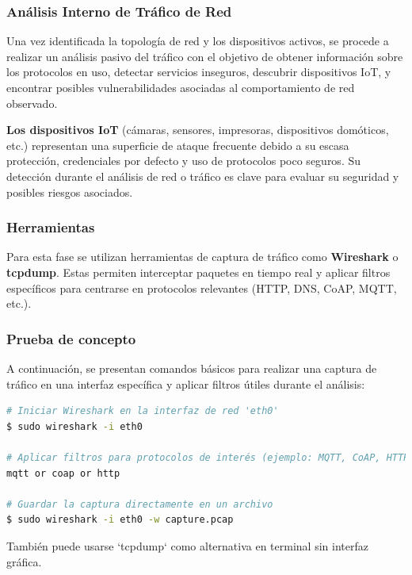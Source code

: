 \documentclass[a4paper, 11pt]{article}
\begin{document}
\subsubsection{Análisis Interno de Tráfico de Red}

Una vez identificada la topología de red y los dispositivos activos, se procede a realizar un análisis pasivo del tráfico con el objetivo 
de obtener información sobre los protocolos en uso, detectar servicios inseguros, descubrir dispositivos IoT, y encontrar posibles vulnerabilidades asociadas al comportamiento de red observado.


\textbf{Los dispositivos IoT} (cámaras, sensores, impresoras, dispositivos domóticos, etc.) representan una superficie de 
ataque frecuente debido a su escasa protección, credenciales por defecto y uso de protocolos poco seguros. Su detección durante 
el análisis de red o tráfico es clave para evaluar su seguridad y posibles riesgos asociados.


\subsubsection*{Herramientas}

Para esta fase se utilizan herramientas de captura de tráfico como \textbf{Wireshark} o \textbf{tcpdump}. Estas permiten interceptar paquetes en tiempo real y aplicar filtros específicos para centrarse en protocolos relevantes (HTTP, DNS, CoAP, MQTT, etc.).


\subsubsection*{Prueba de concepto}

A continuación, se presentan comandos básicos para realizar una captura de tráfico en una interfaz específica y aplicar filtros útiles durante el análisis:

\begin{lstlisting}[language=bash, style=terminalstyle, caption=Captura de tráfico con Wireshark]
# Iniciar Wireshark en la interfaz de red 'eth0'
$ sudo wireshark -i eth0

# Aplicar filtros para protocolos de interés (ejemplo: MQTT, CoAP, HTTP)
mqtt or coap or http

# Guardar la captura directamente en un archivo
$ sudo wireshark -i eth0 -w capture.pcap
\end{lstlisting}

También puede usarse `tcpdump` como alternativa en terminal sin interfaz gráfica.
\end{document}
